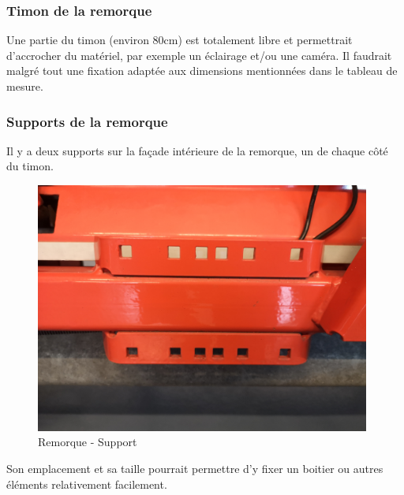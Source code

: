 \subsubsection{Timon de la remorque}
Une partie du timon (environ 80cm) est totalement libre et permettrait d'accrocher du matériel, par exemple un éclairage et/ou une caméra.
Il faudrait malgré tout une fixation adaptée aux dimensions mentionnées dans le tableau de mesure.
\subsubsection{Supports de la remorque}
Il y a deux supports sur la façade intérieure de la remorque, un de chaque côté du timon.
\begin{figure}[H]
    \centering
    \includegraphics[width=11cm]{assets/figures/support.jpg}
    \caption{Remorque - Support}
\end{figure}

Son emplacement et sa taille pourrait permettre d'y fixer un boitier ou autres éléments relativement facilement.